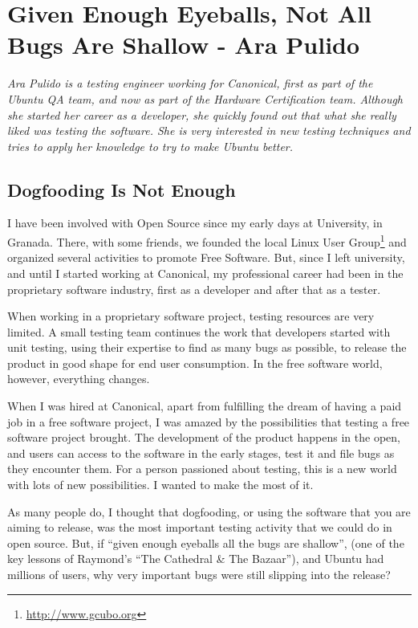 \chapter{Given Enough Eyeballs, Not All Bugs Are Shallow - Ara Pulido}

\textit{Ara Pulido is a testing engineer working for Canonical, first as part of
the Ubuntu QA team, and now as part of the Hardware Certification team. Although
she started her career as a developer, she quickly found out that what she
really liked was testing the software. She is very interested in new testing
techniques and tries to apply her knowledge to try to make Ubuntu better.}

\section*{Dogfooding Is Not Enough} 

I have been involved with Open Source since my early days at University, in
Granada. There, with some friends, we founded the local Linux User
Group\footnote{\url{http://www.gcubo.org}} and organized several activities to
promote Free Software. But, since I left university, and until I started working
at Canonical, my professional career had been in the proprietary software
industry, first as a developer and after that as a tester.

When working in a proprietary software project, testing resources are very
limited. A small testing team continues the work that developers started with
unit testing, using their expertise to find as many bugs as possible, to release
the product in good shape for end user consumption. In the free software world,
however, everything changes.

When I was hired at Canonical, apart from fulfilling the dream of having a paid
job in a free software project, I was amazed by the possibilities that testing a
free software project brought. The development of the product happens in the
open, and users can access to the software in the early stages, test it and file
bugs as they encounter them. For a person passioned about testing, this is a new
world with lots of new possibilities. I wanted to make the most of it.

As many people do, I thought that dogfooding, or using the software that you are
aiming to release, was the most important testing activity that we could do in
open source. But, if ``given enough eyeballs all the bugs are shallow'', (one of
the key lessons of Raymond's ``The Cathedral \& The Bazaar''), and Ubuntu had
millions of users, why very important bugs were still slipping into the release?

